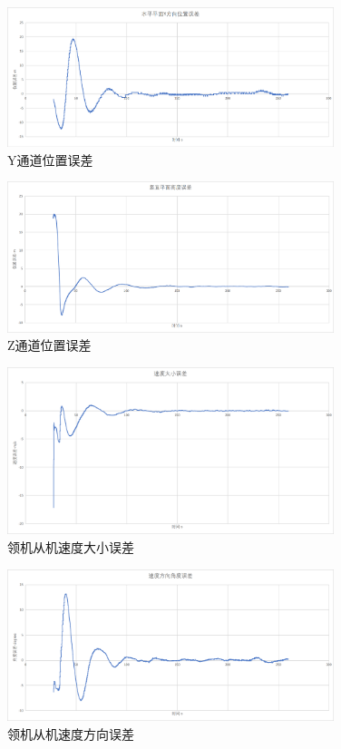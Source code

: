 \begin{figure}[H]
    \centering
    \includegraphics[width=0.85\textwidth]{figures/c5/c5-real-pos_err_y}
    \caption{Y通道位置误差}\label{c5-real-pos_err_y}
\end{figure}
\begin{figure}[H]
    \centering
    \includegraphics[width=0.85\textwidth]{figures/c5/c5-real-pos_err_z}
    \caption{Z通道位置误差}\label{c5-real-pos_err_z}
\end{figure}
\begin{figure}[H]
    \centering
    \includegraphics[width=0.85\textwidth]{figures/c5/c5-real-vel_err}
    \caption{领机从机速度大小误差}\label{c5-real-vel_err}
\end{figure}
\begin{figure}[H]
    \centering
    \includegraphics[width=0.85\textwidth]{figures/c5/c5-real-eta_err}
    \caption{领机从机速度方向误差}\label{c5-real-eta_err}
\end{figure}
